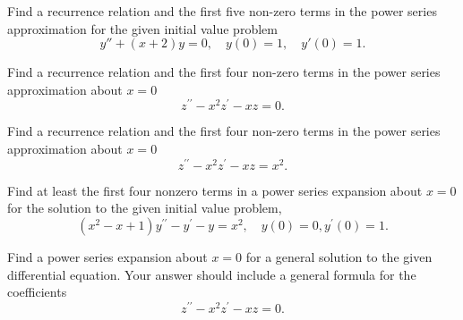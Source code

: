 \documentclass[11pt]{article}
\begin{document}
\makelabtitle




\begin{problem}
{Find a recurrence relation and the first five non-zero terms in the power series approximation for the given initial value problem}
\begin{equation*}
y'' + (x+2)y = 0, \quad y(0)=1, \quad y'(0)=1.
\end{equation*}
\end{problem}


\begin{problem}
{Find a recurrence relation and the first four non-zero terms in the power series approximation about $x=0$}
\begin{equation*}
z^{\prime \prime} - x^2 z^{\prime} - xz =0.
\end{equation*}
\end{problem}


\begin{problem}
{Find a recurrence relation and the first four non-zero terms in the power series approximation about $x=0$}
\begin{equation*}
z^{\prime \prime} - x^2 z^{\prime} - xz =x^2.
\end{equation*}
\end{problem}



\begin{problem}
Find at least the first four nonzero terms in a power series expansion about $x=0$ for the solution to the given initial value problem,
\begin{equation*}
(x^2-x+1)y^{\prime \prime} - y^{\prime} -y=x^{2},\quad y(0)=0, y^{\prime}(0)=1.
\end{equation*}
\end{problem}


\begin{problem}
{ Find a power series expansion about $x =0$ for a general solution to the given differential equation. Your answer should include a general formula for the coefficients}
\begin{equation*}
z^{\prime \prime} - x^2 z^{\prime} - xz =0.
\end{equation*}
\end{problem}
\end{document}
